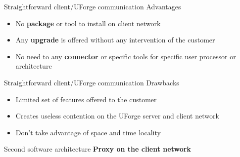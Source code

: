 \documentclass[xcolor=x11names,compress]{beamer}
\renewcommand{\(}{\begin{columns}}
\renewcommand{\)}{\end{columns}}
\newcommand{\<}[1]{\begin{column}{#1}}
\renewcommand{\>}{\end{column}}
\begin{document}
\begin{frame}{Straightforward client/UForge communication}
	Advantages
	\begin{itemize}
		\item No \textbf{package} or tool to install on client network
		\item Any \textbf{upgrade} is offered without any intervention of the customer
		\item No need to any \textbf{connector} or specific tools for specific user processor or architecture
	\end{itemize}
\end{frame}


\begin{frame}{Straightforward client/UForge communication}
	Drawbacks
	\begin{itemize}
		\item Limited set of features offered to the customer
        \item Creates useless contention on the UForge server and client network
        \item Don't take advantage of space and time locality
	\end{itemize}
\end{frame}


\begin{frame}{Second software architecture}
	\textbf{Proxy on the client network}
	\begin{figure}[t]
	\begin{center}
	\end{center}
	\end{figure}
\end{frame}


\end{document}
